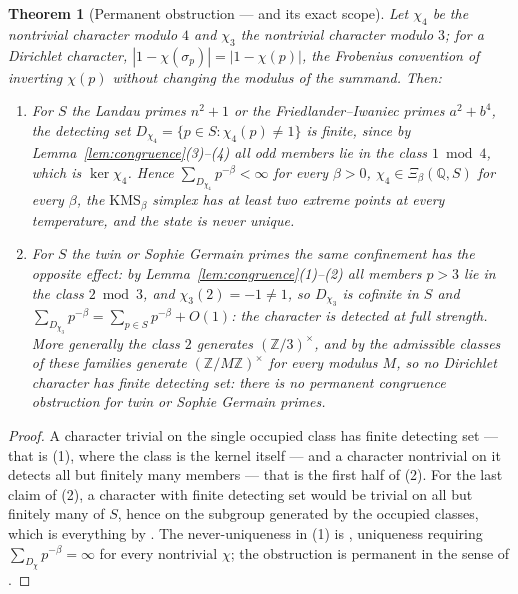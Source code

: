 \documentclass[11pt]{amsart}
\numberwithin{equation}{section}
\newtheorem{theorem}{Theorem}[section]
\theoremstyle{definition}
\theoremstyle{remark}
\newcommand{\Z}{\mathbb{Z}}
\newcommand{\Q}{\mathbb{Q}}
\begin{document}
\begin{theorem}[Permanent obstruction --- and its exact scope]\label{thm:permanent}
Let $\chi_4$ be the nontrivial character modulo $4$ and $\chi_3$ the nontrivial character
modulo $3$; for a Dirichlet character, $|1-\chi(\sigma_p)|=|1-\chi(p)|$, the Frobenius
convention of \cite[(1.1)]{Main} inverting $\chi(p)$ without changing the modulus of the
summand. Then:
\begin{enumerate}
\item For $S$ the Landau primes $n^2+1$ or the Friedlander--Iwaniec primes $a^2+b^4$, the
detecting set $D_{\chi_4}=\{p\in S:\chi_4(p)\ne1\}$ is \emph{finite}, since by
Lemma~\ref{lem:congruence}(3)--(4) all odd members lie in the class $1\bmod4$, which is
$\ker\chi_4$. Hence $\sum_{D_{\chi_4}}p^{-\beta}<\infty$ for every $\beta>0$,
$\chi_4\in\Xi_\beta(\Q,S)$ for every $\beta$, the $\mathrm{KMS}_\beta$ simplex has at
least two extreme points at every temperature, and the state is \emph{never} unique.
\item For $S$ the twin or Sophie Germain primes the same confinement has the opposite
effect: by Lemma~\ref{lem:congruence}(1)--(2) all members $p>3$ lie in the class $2\bmod3$,
and $\chi_3(2)=-1\ne1$, so $D_{\chi_3}$ is \emph{cofinite} in $S$ and
$\sum_{D_{\chi_3}}p^{-\beta}=\sum_{p\in S}p^{-\beta}+O(1)$: the character is detected at
full strength. More generally the class $2$ generates $(\Z/3)^\times$, and by
\cite[Lem.~5.6]{Main} the admissible classes of these families generate
$(\Z/M\Z)^\times$ for every modulus $M$, so \emph{no} Dirichlet character has finite
detecting set: there is no permanent congruence obstruction for twin or Sophie Germain
primes.
\end{enumerate}
\end{theorem}

\begin{proof}
A character trivial on the single occupied class has finite detecting set --- that is (1),
where the class is the kernel itself --- and a character nontrivial on it detects all but
finitely many members --- that is the first half of (2). For the last claim of (2), a
character with finite detecting set would be trivial on all but finitely many of $S$, hence
on the subgroup generated by the occupied classes, which is everything by
\cite[Lem.~5.6]{Main}. The never-uniqueness in (1) is \cite[Thm.~3.9]{Main}, uniqueness
requiring $\sum_{D_\chi}p^{-\beta}=\infty$ for every nontrivial $\chi$; the obstruction is
permanent in the sense of \cite[\S4.1]{Main}.
\end{proof}
\end{document}
